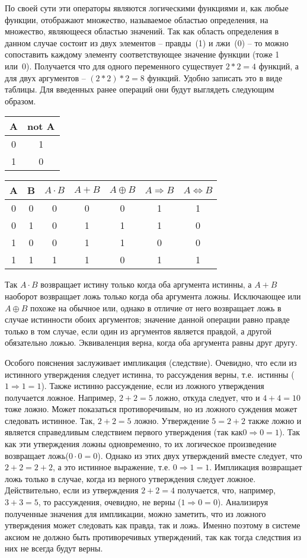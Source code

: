 По своей сути эти операторы являются логическими функциями и, как любые функции, отображают множество, называемое областью определения,  на множество, являющееся областью значений. Так как область определения в данном случае состоит из двух элементов -- правды~(1) и лжи~(0) -- то можно сопоставить каждому элементу соответствующее значение функции (тоже 1 или~0). Получается что для одного переменного существует $2*2=4$ функций, а для двух аргументов -- $(2*2)*2=8$ функций. Удобно записать это в виде таблицы. Для введенных ранее операций они будут выглядеть следующим образом.

\begin{tabular}{c|c}
	A&  not A\\ 
	\hline  
	0&  1\\ 
	1&  0\\  
\end{tabular} \qquad \qquad
%
\begin{tabular}{cc|c|c|c|c|c}
	A&  B&  $A \cdot B$&  $A+B$&  $A \oplus B$& $A\Rightarrow B$&  $A \Leftrightarrow B$\\ 
	\hline
	0&  0&  0&  0&  0&	1&  1\\ 
	0&  1&  0&  1&  1&	1&  0\\ 
	1&  0&  0&  1&  1&	0&  0\\ 
	1&  1&  1&  1&  0&	1&  1\\ 
\end{tabular} 

Так $A \cdot B$ возвращает истину только когда оба аргумента истинны, а $A+B$ наоборот возвращает ложь только когда оба аргумента ложны. Исключающее или $A \oplus B$ похоже на обычное или, однако в отличие от него возвращает ложь в случае истинности обоих аргументов; значение данной операции равно правде только в том случае, если один из аргументов является правдой, а другой обязательно ложью. 
Эквиваленция верна, когда оба аргумента равны друг другу.

Особого пояснения заслуживает импликация (следствие). Очевидно, что если из истинного утверждения следует истинна, то рассуждения верны, т.е.~истинны ($1\Rightarrow 1 = 1$). Также истинно рассуждение, если из ложного утверждения получается ложное. Например, $2+2 = 5$ ложно, откуда следует, что и $4+4=10$ тоже ложно. Может показаться противоречивым, но из ложного суждения может следовать истинное. Так, $2+2 = 5$ ложно. Утверждение $5=2+2$ также ложно и является справедливым следствием первого утверждения (так как$0 \Rightarrow 0 = 1$). Так как эти утверждения ложны одновременно, то их логическое произведение возвращает ложь($0\cdot 0 = 0$). Однако из этих двух утверждений вместе следует, что $2+2 = 2+2$, а это истинное выражение, т.е. $0 \Rightarrow 1 = 1$. Импликация возвращает ложь только в случае, когда из верного утверждения следует ложное. Действительно, если из утверждения $2+2=4$ получается, что, например, $3+3=5$, то рассуждения, очевидно, не верны ($1 \Rightarrow 0 = 0$). Анализируя полученные значения для импликации, можно заметить, что из ложного утверждения может следовать как правда, так и ложь. Именно поэтому в системе аксиом не должно быть противоречивых утверждений, так как тогда следствия из них не всегда будут верны. 

